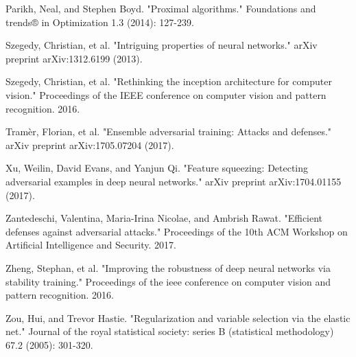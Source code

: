 \begin{thebibliography}{9}
	\bibitem{}
	Parikh, Neal, and Stephen Boyd. "Proximal algorithms." Foundations and trends® in Optimization 1.3 (2014): 127-239.
	
	\bibitem{}
	Szegedy, Christian, et al. "Intriguing properties of neural networks." arXiv preprint arXiv:1312.6199 (2013).
	
	\bibitem{}
	Szegedy, Christian, et al. "Rethinking the inception architecture for computer vision." Proceedings of the IEEE conference on computer vision and pattern recognition. 2016.
	
	\bibitem{}
	Tramèr, Florian, et al. "Ensemble adversarial training: Attacks and defenses." arXiv preprint arXiv:1705.07204 (2017).
	
	\bibitem{}
	Xu, Weilin, David Evans, and Yanjun Qi. "Feature squeezing: Detecting adversarial examples in deep neural networks." arXiv preprint arXiv:1704.01155 (2017).
	
	\bibitem{}
	Zantedeschi, Valentina, Maria-Irina Nicolae, and Ambrish Rawat. "Efficient defenses against adversarial attacks." Proceedings of the 10th ACM Workshop on Artificial Intelligence and Security. 2017.
	
	\bibitem{}
	Zheng, Stephan, et al. "Improving the robustness of deep neural networks via stability training." Proceedings of the ieee conference on computer vision and pattern recognition. 2016.
	
	\bibitem{}
	Zou, Hui, and Trevor Hastie. "Regularization and variable selection via the elastic net." Journal of the royal statistical society: series B (statistical methodology) 67.2 (2005): 301-320.
\end{thebibliography}